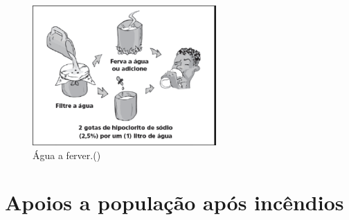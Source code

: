\documentclass{report}
\begin{document}
\begin{figure}[H]
\center
\includegraphics[width=7cm]{pic2.png}
\caption{Água a ferver.(\cite{fquim})}
\label{quimi}
\end{figure}



\chapter{Apoios a população após incêndios}
\label{apoios à população após incêndios e prevenção de incêndios}
\cite{pgov2017}
\end{document}
